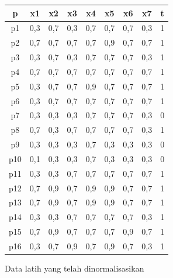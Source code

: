 \begin{center}
	\begin{tabular}{|c|c|c|c|c|c|c|c|c|}
		\hline
		p & x1 & x2 & x3 & x4 & x5 & x6 & x7 & t \\
		\hline
		\hline
		p1 & 0,3 & 0,7 & 0,3 & 0,7 & 0,7 & 0,7 & 0,3 & 1 \\
		\hline
		p2  & 0,7 & 0,7 & 0,7 & 0,7 & 0,9 & 0,7 & 0,7 & 1 \\
		\hline
		p3  & 0,3 & 0,7 & 0,3 & 0,7 & 0,7 & 0,7 & 0,3 & 1 \\
		\hline
		p4  & 0,7 & 0,7 & 0,7 & 0,7 & 0,7 & 0,7 & 0,7 & 1 \\
		\hline
		p5  & 0,3 & 0,7 & 0,7 & 0,9 & 0,7 & 0,7 & 0,7 & 1 \\
		\hline
		p6  & 0,3 & 0,7 & 0,7 & 0,7 & 0,7 & 0,7 & 0,7 & 1 \\
		\hline
		p7  & 0,3 & 0,3 & 0,3 & 0,7 & 0,7 & 0,7 & 0,3 & 0 \\
		\hline
		p8  & 0,7 & 0,3 & 0,7 & 0,7 & 0,7 & 0,7 & 0,3 & 1 \\
		\hline
		p9  & 0,3 & 0,3 & 0,3 & 0,7 & 0,3 & 0,3 & 0,3 & 0 \\
		\hline
		p10 &  0,1 & 0,3 & 0,3 & 0,7 & 0,3 & 0,3 & 0,3 & 0 \\
		\hline
		p11 &  0,3 & 0,3 & 0,7 & 0,7 & 0,7 & 0,7 & 0,7 & 1 \\
		\hline
		p12 &  0,7 & 0,9 & 0,7 & 0,9 & 0,9 & 0,7 & 0,7 & 1 \\
		\hline
		p13 &  0,7 & 0,9 & 0,7 & 0,9 & 0,9 & 0,7 & 0,7 & 1 \\
		\hline
		p14 &  0,3 & 0,3 & 0,7 & 0,7 & 0,7 & 0,7 & 0,3 & 1 \\
		\hline
		p15 &  0,7 & 0,9 & 0,7 & 0,7 & 0,7 & 0,9 & 0,7 & 1 \\
		\hline
		p16 &  0,3 & 0,7 & 0,9 & 0,7 & 0,9 & 0,7 & 0,3 & 1 \\
		\hline
	\end{tabular}
\par
\bigskip
Data latih yang telah dinormalisasikan
\end{center}



